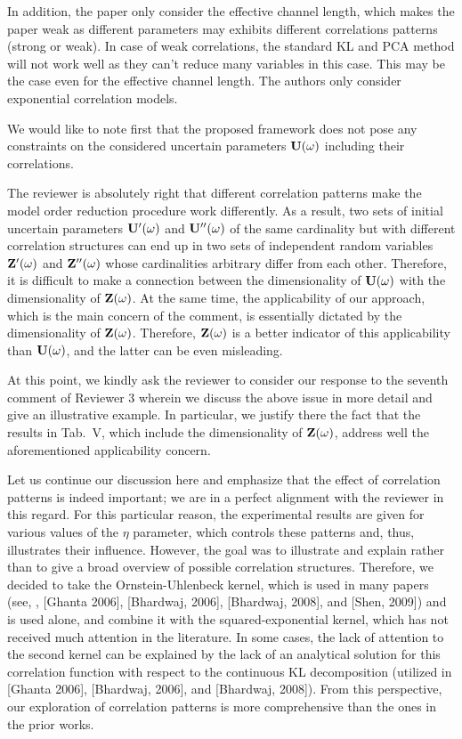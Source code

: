 \begin{reviewer}
In addition, the paper only consider the effective channel length, which makes the paper weak as different parameters may exhibits different correlations patterns (strong or weak). In case of weak correlations, the standard KL and PCA method will not work well as they can’t reduce many variables in this case. This may be the case even for the effective channel length. The authors only consider exponential correlation models.
\end{reviewer}
\begin{authors}
We would like to note first that the proposed framework does not pose any constraints on the considered uncertain parameters $\mathbf{U}(\omega)$ including their correlations.

The reviewer is absolutely right that different correlation patterns make the model order reduction procedure work differently.
As a result, two sets of initial uncertain parameters $\mathbf{U}'(\omega)$ and $\mathbf{U}''(\omega)$ of the same cardinality but with different correlation structures can end up in two sets of independent random variables $\mathbf{Z}'(\omega)$ and $\mathbf{Z}''(\omega)$ whose cardinalities arbitrary differ from each other.
Therefore, it is difficult to make a connection between the dimensionality of $\mathbf{U}(\omega)$ with the dimensionality of $\mathbf{Z}(\omega)$.
At the same time, the applicability of our approach, which is the main concern of the comment, is essentially dictated by the dimensionality of $\mathbf{Z}(\omega)$.
Therefore, $\mathbf{Z}(\omega)$ is a better indicator of this applicability than $\mathbf{U}(\omega)$, and the latter can be even misleading.

At this point, we kindly ask the reviewer to consider our response to the seventh comment of Reviewer 3 wherein we discuss the above issue in more detail and give an illustrative example.
In particular, we justify there the fact that the results in Tab.~V, which include the dimensionality of $\mathbf{Z}(\omega)$, address well the aforementioned applicability concern.

Let us continue our discussion here and emphasize that the effect of correlation patterns is indeed important; we are in a perfect alignment with the reviewer in this regard.
For this particular reason, the experimental results are given for various values of the $\eta$ parameter, which controls these patterns and, thus, illustrates their influence.
However, the goal was to illustrate and explain rather than to give a broad overview of possible correlation structures.
Therefore, we decided to take the Ornstein-Uhlenbeck kernel, which is used in many papers (see, \eg, [Ghanta 2006], [Bhardwaj, 2006], [Bhardwaj, 2008], and [Shen, 2009]) and is used alone, and combine it with the squared-exponential kernel, which has not received much attention in the literature.
In some cases, the lack of attention to the second kernel can be explained by the lack of an analytical solution for this correlation function with respect to the continuous KL decomposition (utilized in [Ghanta 2006], [Bhardwaj, 2006], and [Bhardwaj, 2008]).
From this perspective, our exploration of correlation patterns is more comprehensive than the ones in the prior works.


\end{authors}
